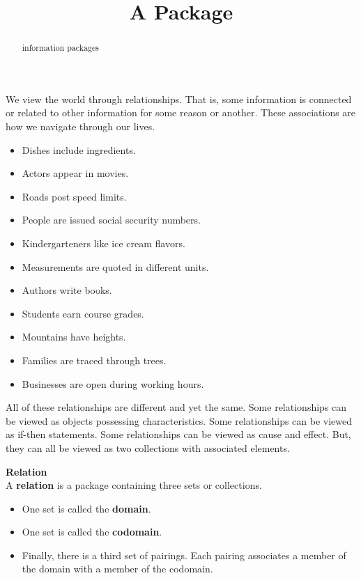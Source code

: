 \documentclass{ximera}
\title{A Package}
\begin{document}
\begin{abstract}
information packages
\end{abstract}
\maketitle


We view the world through relationships. That is, some information is connected or related to other information for some reason or another. These associations are how we navigate through our lives.

\begin{itemize}
\item Dishes include ingredients.
\item Actors appear in movies.
\item Roads post speed limits.
\item People are issued social security numbers.
\item Kindergarteners like ice cream flavors.
\item Measurements are quoted in different units.
\item Authors write books.
\item Students earn course grades.
\item Mountains have heights.
\item Families are traced through trees.
\item Businesses are open during working hours.
\end{itemize}


All of these relationships are different and yet the same.  Some relationships can be viewed as objects possessing characteristics. Some relationships can be viewed as if-then statements.  Some relationships can be viewed as cause and effect. But, they can all be viewed as two collections with associated elements.







\begin{definition} \textbf{\textcolor{green!50!black}{Relation}} \\
A \textbf{relation} is a package containing three sets or collections. 


\begin{itemize}
\item One set is called the \textbf{\textcolor{purple!85!blue}{domain}}. 
\item One set is called the \textbf{\textcolor{purple!85!blue}{codomain}}.  
\item Finally, there is a third set of pairings.  Each pairing associates a member of the domain with a member of the codomain.
\end{itemize}

\end{definition}
\end{document}
